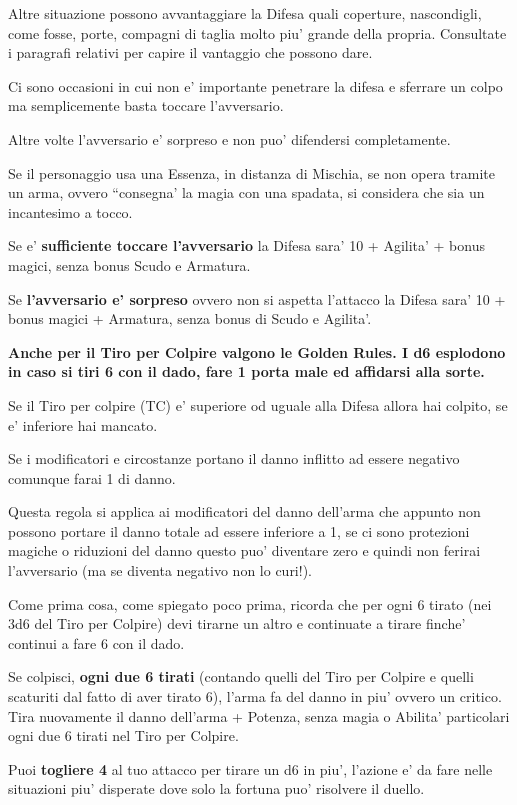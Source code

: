 \documentclass[a4paper,11pt,twoside,openany]{dndbook}
\begin{document}
Altre situazione possono avvantaggiare la Difesa quali coperture, nascondigli, come fosse, porte, compagni di taglia molto piu' grande della propria. Consultate i paragrafi relativi per capire il vantaggio che possono dare.

Ci sono occasioni in cui non e' importante penetrare la difesa e sferrare un colpo ma semplicemente basta toccare l'avversario.

Altre volte l'avversario e' sorpreso e non puo' difendersi completamente.

Se il personaggio usa una Essenza, in distanza di Mischia, se non opera tramite un arma, ovvero ``consegna' la magia con una spadata, si considera che sia un incantesimo a tocco.

Se e' \textbf{sufficiente toccare l'avversario} la Difesa sara' 10 + Agilita' + bonus magici, senza bonus Scudo e Armatura.

Se \textbf{l'avversario e' sorpreso} ovvero non si aspetta l'attacco la Difesa sara' 10 + bonus magici + Armatura, senza bonus di Scudo e Agilita'.

\textbf{Anche per il Tiro per Colpire valgono le Golden Rules. I d6 esplodono in caso si tiri 6 con il dado, fare 1 porta male ed affidarsi alla sorte.}

Se il Tiro per colpire (TC) e' superiore od uguale alla Difesa allora hai colpito, se e' inferiore hai mancato.

Se i modificatori e circostanze portano il danno inflitto ad essere negativo comunque farai 1 di danno.

Questa regola si applica ai modificatori del danno dell'arma che appunto non possono portare il danno totale ad essere inferiore a 1, se ci sono protezioni magiche o riduzioni del danno questo puo' diventare zero e quindi non ferirai l'avversario (ma se diventa negativo non lo curi!).

Come prima cosa, come spiegato poco prima, ricorda che per ogni 6 tirato (nei 3d6 del Tiro per Colpire) devi tirarne un altro e continuate a tirare finche' continui a fare 6 con il dado.

Se colpisci, \textbf{ogni due 6 tirati} (contando quelli del Tiro per Colpire e quelli scaturiti dal fatto di aver tirato 6), l'arma fa del danno in piu' ovvero un critico. Tira nuovamente il danno dell'arma + Potenza, senza magia o Abilita' particolari ogni due 6 tirati nel Tiro per Colpire.

Puoi \textbf{togliere 4} al tuo attacco per tirare un d6 in piu', l'azione e' da fare nelle situazioni piu' disperate dove solo la fortuna puo' risolvere il duello.
\end{document}
